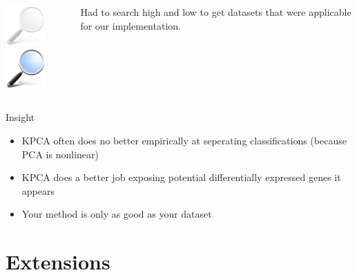 \documentclass[serif]{beamer}
\begin{document}
\begin{frame}[t]
{\begin{itemize}
{\begin{columns}
\begin{column}{3.5in}
							\begin{block}{\vspace{-0.5in}}
							\begin{columns}
								\begin{column}{1.0in}
									\begin{center}
										{
											\includegraphics[width=0.60in]{images/search_dimmed}	
										}
										\only<8>
										{
											\includegraphics[width=0.60in]{images/search}
										}
									\end{center}
								\end{column}
								\begin{column}{2.5in}
									\color<6-7>{blockgray}
									{
										\footnotesize
										Had to search high and low to get datasets that were applicable for our implementation.
									}
								\end{column}	
							\end{columns}
							\end{block}
						\end{column}
					\end{columns}
				}
			\end{itemize}
		}
		{
			{\huge \sc Insight}
		
			\begin{itemize}
				\item  KPCA often does no better empirically at seperating classifications
				(because PCA is nonlinear)
				\item  KPCA does a better job exposing potential differentially
				expressed genes it appears
				\item  Your method is only as good as your dataset
			\end{itemize}		
		}
	\end{frame}
	
	\section{Extensions}
	
\end{document}
